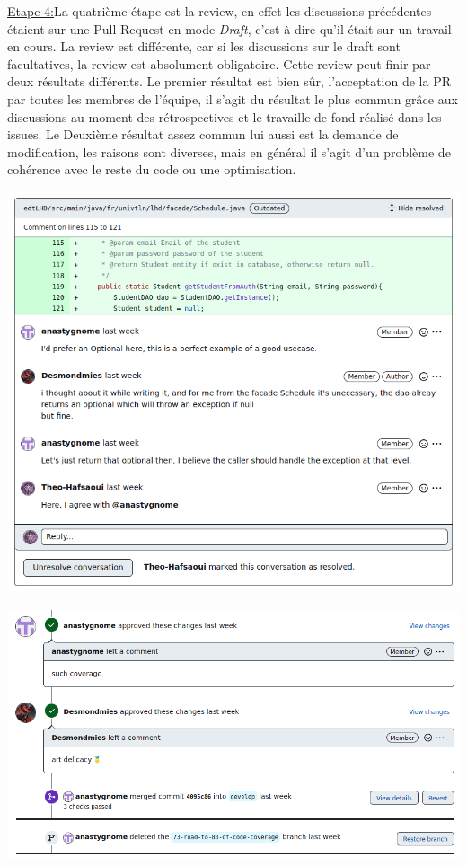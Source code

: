 \documentclass[a4paper,french,final]{memoir}
\begin{document}
\begin{minipage}{0.5\textwidth}
\underline{Etape 4:}La quatrième étape est la review, en effet les discussions précédentes étaient sur une Pull Request en mode \emph{Draft}, c'est-à-dire qu'il était sur un travail en cours. La review est différente, car si les discussions sur le draft sont facultatives, la review est absolument
obligatoire. Cette review peut finir par deux résultats différents. Le premier résultat est bien sûr, l'acceptation de la PR par toutes les membres
de l'équipe, il s'agit du résultat le plus commun grâce aux discussions au moment des rétrospectives et le travaille de fond réalisé dans les issues.
Le Deuxième résultat assez commun lui aussi est la demande de modification, les raisons sont diverses, mais en général il s'agit d'un problème de cohérence avec le reste du code ou une optimisation.
\end{minipage}
\begin{minipage}{0.5\textwidth}
\includegraphics[width=\textwidth]{figures/review.png}
\end{minipage}

\begin{center}
    \includegraphics[width=\textwidth]{figures/end.png}
\end{center}
\end{document}
